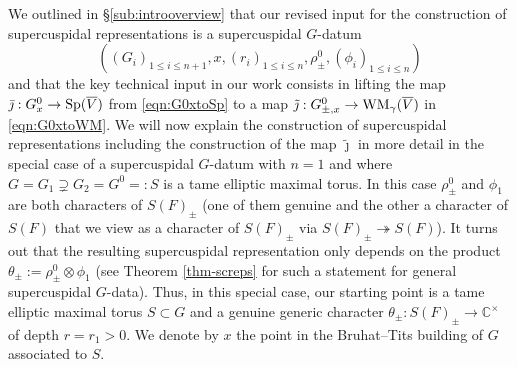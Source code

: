 \documentclass{article}
\def\C{\mathbb{C}}
\def\ol#1{\overline{#1}}
\DeclareMathOperator{\Sp}{Sp}
\theoremstyle{definition}
\numberwithin{equation}{subsection}
\renewcommand{\-}{\hyp{}}
\DeclareMathOperator{\WM}{WM}
\begin{document}
We outlined in \S\ref{sub:introoverview} that our revised input for the construction of supercuspidal representations is a supercuspidal $G$-datum 
\[((G_i)_{1\leq i\leq n+1},x,(r_i)_{1\leq i\leq n},\rho^0_{\pm},(\phi_i)_{1\leq i\leq n}) \]
and that the key technical input in our work consists in lifting the map $\bar\jmath : G^0_x \ra \Sp(\ol{V}) $ from \eqref{eqn:G0xtoSp} to a map $\tilde\jmath :  G^0_{\pm,x} \ra \WM_\gamma(\ol{V})$ in \eqref{eqn:G0xtoWM}. 
We will now explain the construction of supercuspidal representations including the construction of the map $\tilde\jmath$ in more detail in the special case of a supercuspidal $G$-datum with $n=1$ and where $G=G_1 \supsetneq G_2=G^0=:S$ is a tame elliptic maximal torus. In this case $\rho^0_{\pm}$ and $\phi_1$ are both characters of $S(F)_{\pm}$ (one of them genuine and the other a character of $S(F)$ that we view as a character of $S(F)_{\pm}$ via $S(F)_{\pm} \twoheadrightarrow S(F)$). It turns out that the resulting supercuspidal representation only depends on the product $\theta_{\pm}:=\rho^0_{\pm} \otimes \phi_1$ (see Theorem \ref{thm-screps} for such a statement for general supercuspidal $G$-data). Thus, in this special case, our starting point is a tame elliptic maximal torus $S \subset G$ and a genuine generic character $\theta_{\pm} : S(F)_{\pm} \to \C^\times$ of depth $r=r_1>0$. We denote by $x$ the point in the Bruhat--Tits building of $G$ associated to $S$. 
\end{document}
